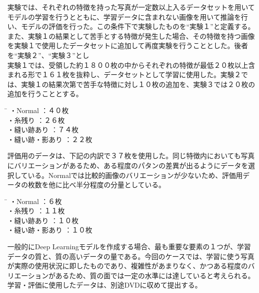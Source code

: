 実験では、それぞれの特徴を持った写真が一定数以上入るデータセットを用いてモデルの学習を行うとともに、学習データに含まれない画像を用いて推論を行い、モデルの評価を行った。この条件下で実験したものを“実験１”と定義する。また、実験１の結果として苦手とする特徴が発生した場合、その特徴を持つ画像を実験１で使用したデータセットに追加して再度実験を行うこととした。後者を“実験２”、“実験３”とし
\\
実験１では、受領した約１８００枚の中からそれぞれの特徴が最低２０枚以上含まれる形で１６１枚を抜粋し、データセットとして学習に使用した。実験２では、実験１の結果次第で苦手な特徴に対し１０枚の追加を、実験３では２０枚の追加を行うこととする。

\begin{tabbing}
\hspace{25mm}\= \hspace{10mm} \kill
・Normal \>：４０枚\\
・糸残り \>	：２６枚 \\
・縫い跡あり \>：７４枚 \\
・縫い跡・影あり \>：２２枚\\
\end{tabbing}

評価用のデータは、下記の内訳で３７枚を使用した。同じ特徴内においても写真にバリエーションがあるため、ある程度のパタンの差異が出るようにデータを選択している。Normalでは比較的画像のバリエーションが少ないため、評価用データの枚数を他に比べ半分程度の分量としている。

\begin{tabbing}
\hspace{25mm}\= \hspace{10mm} \kill
・Normal \>：６枚\\
・糸残り \>	：１１枚 \\
・縫い跡あり \>：１０枚 \\
・縫い跡・影あり \>：１０枚\\
\end{tabbing}

一般的にDeep Learningモデルを作成する場合、最も重要な要素の１つが、学習データの質と、質の高いデータの量である。今回のケースでは、学習に使う写真が実際の使用状況に即したものであり、複雑性があまりなく、かつある程度のバリエーションがあるため、質の面では一定の水準には達していると考えられる。学習・評価に使用したデータは、別途DVDに収めて提出する。